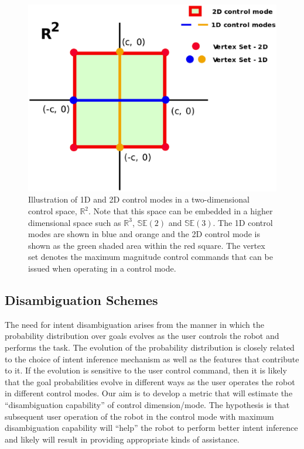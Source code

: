\documentclass[conference]{IEEEtran}
\begin{document}
 \begin{figure}[h]
	\centering
	\includegraphics[width= 0.8\hsize, height=0.2\vsize]{./figures/R2_ControlModes.eps}
	\vspace{-0.35cm}
	\caption{Illustration of 1D and 2D control modes in a two-dimensional control space, $\mathbb{R}^2$. Note that this space can be embedded in a higher dimensional space such as $\mathbb{R}^3$, $\mathbb{SE}(2)$ and $\mathbb{SE}(3)$. The 1D control modes are shown in blue and orange and the 2D control mode is shown as the green shaded area within the red square. The vertex set denotes the maximum magnitude control commands that can be issued when operating in a control mode. }
	\label{fig:r2_modes}
\end{figure}

\subsection{Disambiguation Schemes}\label{ssec:disamb}

The need for intent disambiguation arises from the manner in which the probability distribution over goals evolves as the user controls the robot and performs the task. The evolution of the probability distribution is closely related to the choice of intent inference mechanism as well as the features that contribute to it. If the evolution is sensitive to the user control command, then it is likely that the goal probabilities evolve in different ways as the user operates the robot in different control modes. Our aim is to develop a metric that will estimate the ``disambiguation capability'' of control dimension/mode. The hypothesis is that subsequent user operation of the robot in the control mode with maximum disambiguation capability will ``help'' the robot to perform better intent inference and likely will result in providing appropriate kinds of assistance. 
\end{document}
